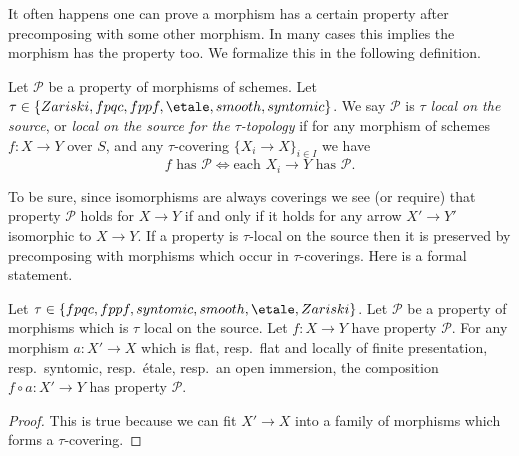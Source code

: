 \noindent
It often happens one can prove a morphism has a certain property
after precomposing with some other morphism. In many cases this
implies the morphism has the property too. We formalize
this in the following definition.

\begin{definition}
\label{definition-property-morphisms-local-source}
Let $\mathcal{P}$ be a property of morphisms of schemes.
Let $\tau \in \{Zariski, \linebreak[0] fpqc, \linebreak[0] fppf, \linebreak[0]
\etale, \linebreak[0] smooth, \linebreak[0] syntomic\}$.
We say $\mathcal{P}$ is
{\it $\tau$ local on the source}, or
{\it local on the source for the $\tau$-topology} if for
any morphism of schemes $f : X \to Y$ over $S$, and any
$\tau$-covering $\{X_i \to X\}_{i \in I}$ we
have
$$
f \text{ has }\mathcal{P}
\Leftrightarrow
\text{each }X_i \to Y\text{ has }\mathcal{P}.
$$
\end{definition}

\noindent
To be sure, since isomorphisms are always coverings
we see (or require) that property $\mathcal{P}$ holds for $X \to Y$
if and only if it holds for any arrow $X' \to Y'$ isomorphic to $X \to Y$.
If a property is $\tau$-local on the source then it is preserved by
precomposing with morphisms which occur in $\tau$-coverings. Here
is a formal statement.

\begin{lemma}
\label{lemma-precompose-property-local-source}
Let $\tau \in \{fpqc, fppf, syntomic, smooth, \etale, Zariski\}$.
Let $\mathcal{P}$ be a property of morphisms which is $\tau$ local
on the source. Let $f : X \to Y$ have property $\mathcal{P}$.
For any morphism $a : X' \to X$ which is
flat, resp.\ flat and locally of finite presentation, resp.\ syntomic,
resp.\ \'etale, resp.\ an open immersion, the composition
$f \circ a : X' \to Y$ has property $\mathcal{P}$.
\end{lemma}

\begin{proof}
This is true because we can fit $X' \to X$ into a family of
morphisms which forms a $\tau$-covering.
\end{proof}

